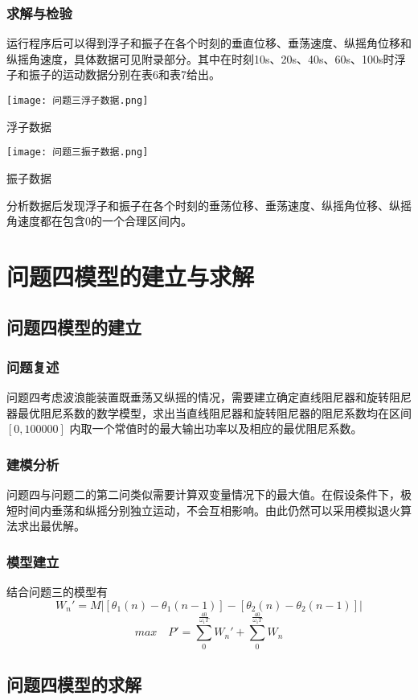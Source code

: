 \documentclass[a4paper,12pt]{article}
\begin{document}
	\subsubsection{求解与检验}
	运行程序后可以得到浮子和振子在各个时刻的垂直位移、垂荡速度、纵摇角位移和纵摇角速度，具体数据可见附录部分。其中在时刻10s、20s、40s、60s、100s时浮子和振子的运动数据分别在表6和表7给出。
	\begin{table}[H]
		\centering
		\texttt{[image: 问题三浮子数据.png]}
		\caption{浮子数据}
		\label{fig:表7}
	\end{table}
	\begin{table}[H]
		\centering
		\texttt{[image: 问题三振子数据.png]}
		\caption{振子数据}
		\label{fig:表8}
	\end{table}
	分析数据后发现浮子和振子在各个时刻的垂荡位移、垂荡速度、纵摇角位移、纵摇角速度都在包含0的一个合理区间内。
	
	\section{问题四模型的建立与求解}
	
	\subsection{问题四模型的建立}
	\subsubsection{问题复述}
	问题四考虑波浪能装置既垂荡又纵摇的情况，需要建立确定直线阻尼器和旋转阻尼器最优阻尼系数的数学模型，求出当直线阻尼器和旋转阻尼器的阻尼系数均在区间 $[0,100000]$ 内取一个常值时的最大输出功率以及相应的最优阻尼系数。
	\subsubsection{建模分析}
	问题四与问题二的第二问类似需要计算双变量情况下的最大值。在假设条件下，极短时间内垂荡和纵摇分别独立运动，不会互相影响。由此仍然可以采用模拟退火算法求出最优解。\cite{ref3}
	\subsubsection{模型建立}
	结合问题三的模型有
	$$W_n'=M|[\theta_1(n)-\theta_1(n-1)]-[\theta_2(n)-\theta_2(n-1)]|$$
	$$max\quad P'=\sum_{0}^{\frac{40}{\omega_1T}}W_n'+\sum_{0}^{\frac{40}{\omega_1T}}W_n$$
	\subsection{问题四模型的求解}
\end{document}
